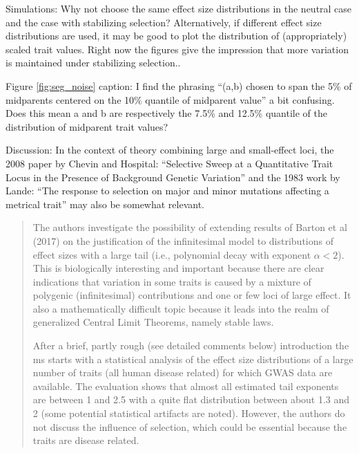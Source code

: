\reply{
}

\begin{point}{}
    Simulations: Why not choose the same effect size distributions in the neutral case and the case with stabilizing selection? Alternatively, if different effect size distributions are used, it may be good to plot the distribution of (appropriately) scaled trait values. Right now the figures give the impression that more variation is maintained under stabilizing selection..
\end{point}


\begin{point}{}
    Figure \ref{fig:seg_noise} caption: I find the phrasing ``(a,b) chosen to span the 5\% of midparents centered on the 10\% quantile of midparent value'' a bit confusing. Does this mean a and b are respectively the 7.5\% and 12.5\% quantile of the distribution of midparent trait values?
\end{point}


\begin{point}{}
    Discussion: In the context of theory combining large and small-effect loci, the 2008 paper by Chevin and Hospital: ``Selective Sweep at a Quantitative Trait Locus in the Presence of Background Genetic Variation'' and the 1983 work by Lande: ``The response to selection on major and minor mutations affecting a metrical trait'' may also be somewhat relevant.
\end{point}

\reply{
}


\begin{quote}
The authors investigate the possibility of extending results of Barton et al (2017) on the
justification of the infinitesimal model to distributions of effect sizes with a large tail (i.e.,
polynomial decay with exponent $\alpha < 2$). This is biologically interesting and important
because there are clear indications that variation in some traits is caused by a mixture
of polygenic (infinitesimal) contributions and one or few loci of large effect. It also a
mathematically difficult topic because it leads into the realm of generalized Central Limit
Theorems, namely stable laws.

After a brief, partly rough (see detailed comments below) introduction the ms starts with
a statistical analysis of the effect size distributions of a large number of traits (all human
disease related) for which GWAS data are available. The evaluation shows that almost
all estimated tail exponents are between 1 and 2.5 with a quite flat distribution between
about 1.3 and 2 (some potential statistical artifacts are noted). However, the authors do
not discuss the influence of selection, which could be essential because the traits are disease
related.
\end{quote}

